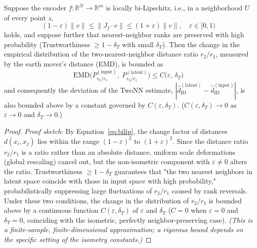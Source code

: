 \documentclass[make,article,submit,pdftex,moreauthors]{Definitions/mdpi}
\newcommand{\R}{\mathbb{R}}
\begin{document}
\begin{Proposition}\label{thm:twonn_stability}
Suppose the encoder $f: \R^N \to \R^m$ is locally bi-Lipschitz,
i.e., in a neighborhood $U$ of every point $z$,
\begin{equation}
  (1-\varepsilon)\|v\| \leq \|J_f \cdot v\| \leq (1+\varepsilon)\|v\|,
  \quad \varepsilon \in [0,1)
  \label{eq:bilip}
\end{equation}
holds, and suppose further that nearest-neighbor ranks are preserved with high
probability (Trustworthiness $\geq 1 - \delta_T$ with small $\delta_T$).
Then the change in the empirical distribution of the two-nearest-neighbor distance ratio
$r_2/r_1$, measured by the earth mover's distance (EMD), is bounded as
\begin{equation}
  \mathrm{EMD}\bigl(P_{r_2/r_1}^{(\mathrm{input})},\; P_{r_2/r_1}^{(\mathrm{latent})}\bigr)
  \leq C\bigl(\varepsilon,\, \delta_T\bigr)
  \label{eq:twonn_stab}
\end{equation}
and consequently the deviation of the TwoNN estimate,
$|\hat{d}_\mathrm{ID}^{(\mathrm{latent})} - \hat{d}_\mathrm{ID}^{(\mathrm{input})}|$,
is also bounded above by a constant governed by $C(\varepsilon,\delta_T)$.
($C(\varepsilon, \delta_T) \to 0$ as $\varepsilon \to 0$ and $\delta_T \to 0$.)
\end{Proposition}

\begin{proof}
\textit{Proof sketch}:
By Equation~\eqref{eq:bilip}, the change factor of distances $d(x_i, x_j)$ lies within
the range $(1-\varepsilon)^2$ to $(1+\varepsilon)^2$.
Since the distance ratio $r_2/r_1$ is a ratio rather than an absolute distance, uniform
scale deformations (global rescaling) cancel out, but the non-isometric component with
$\varepsilon \neq 0$ alters the ratio.
Trustworthiness $\geq 1-\delta_T$ guarantees that "the two nearest neighbors in latent
space coincide with those in input space with high probability," probabilistically
suppressing large fluctuations of $r_2/r_1$ caused by rank reversals.
Under these two conditions, the change in the distribution of $r_2/r_1$ is bounded above
by a continuous function $C(\varepsilon,\delta_T)$ of $\varepsilon$ and $\delta_T$
($C=0$ when $\varepsilon=0$ and $\delta_T=0$, coinciding with the isometric,
perfectly neighbor-preserving case).
\textit{(This is a finite-sample, finite-dimensional approximation; a rigorous bound
depends on the specific setting of the isometry constants.)}
\end{proof}
\end{document}
